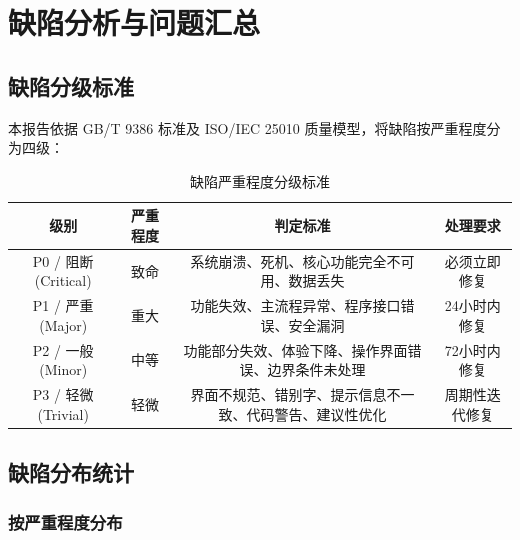 
\section{缺陷分析与问题汇总}

\subsection{缺陷分级标准}

本报告依据 GB/T 9386 标准及 ISO/IEC 25010 质量模型，将缺陷按严重程度分为四级：

\begin{table}[htbp]
    \centering
    \caption{缺陷严重程度分级标准}
    \begin{tabular}{|c|c|c|c|}
        \hline
        \textbf{级别} & \textbf{严重程度} & \textbf{判定标准} & \textbf{处理要求} \\
        \hline
        P0 / 阻断 (Critical) & 致命 & 系统崩溃、死机、核心功能完全不可用、数据丢失 & 必须立即修复 \\
        \hline
        P1 / 严重 (Major) & 重大 & 功能失效、主流程异常、程序接口错误、安全漏洞 & 24小时内修复 \\
        \hline
        P2 / 一般 (Minor) & 中等 & 功能部分失效、体验下降、操作界面错误、边界条件未处理 & 72小时内修复 \\
        \hline
        P3 / 轻微 (Trivial) & 轻微 & 界面不规范、错别字、提示信息不一致、代码警告、建议性优化 & 周期性迭代修复 \\
        \hline
    \end{tabular}
\end{table}

\subsection{缺陷分布统计}

\subsubsection{按严重程度分布}

